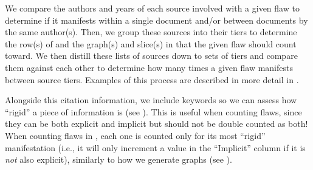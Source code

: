 We compare the authors and years of each source involved with a given flaw
to determine if it manifests within a single document and/or between documents
by the same author(s). Then, we group these sources into their tiers
to determine the row(s) of  and the graph(s)
and slice(s) in  that the given flaw should count toward.
We then distill these lists of sources down to sets of tiers and compare them
against each other to determine how many times a given flaw manifests between
source tiers. Examples of this process are described in more detail in
.

\label{auto-flaw-analysis-rigidity}
Alongside this citation information, we include keywords so we can assess how
``rigid'' a piece of information is (see ). This is useful when
counting flaws, since they can be both explicit and implicit but should not be
double counted as both! When counting flaws in
, each one is
counted only for its most ``rigid'' manifestation (i.e., it will only increment
a value in the ``Implicit'' column if it is \emph{not} also explicit),
similarly to how we generate graphs (see ).

